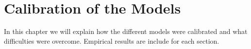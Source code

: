 \chapter{Calibration of the Models}
\label{chpr:calibration}

In this chapter we will explain how the different models were calibrated and what difficulties were overcome. Empirical results are include for each section.

\bigskip


